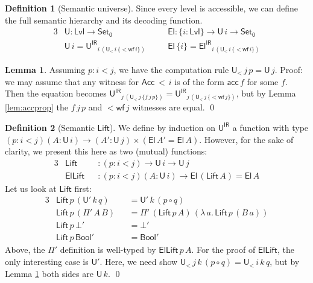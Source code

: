 \documentclass[a4paper,UKenglish,cleveref, autoref, thm-restate]{lipics-v2021}
\theoremstyle{remark}
\theoremstyle{definition}
\newtheorem{mydefinition}{Definition}
\newtheorem{mylemma}{Lemma}
\newcommand{\Set}[1]{\mathsf{Set_{#1}}}
\newcommand{\U}{\mathsf{U}}
\newcommand{\El}{\mathsf{El}}
\newcommand{\Bool}{\mathsf{Bool}}
\newcommand{\Lift}{\mathsf{Lift}}
\newcommand{\Acc}{\mathsf{Acc}}
\newcommand{\acc}{\mathsf{acc}}
\newcommand{\Lvl}{\mathsf{Lvl}}
\renewcommand{\U}{\mathsf{U}}
\newcommand{\msf}[1]{\mathsf{#1}}
\newcommand{\uir}{\msf{U^{IR}}}
\newcommand{\elir}{\msf{El^{IR}}}
\newcommand{\ult}{\U_{<}}
\begin{document}
\begin{mydefinition}[Semantic universe]
Since every level is accessible, we can define the full semantic hierarchy and
its decoding function.
\begin{alignat*}{3}
  &\U : \Lvl \to \Set0
     && \El : \{i : \Lvl\} \to \U\,i \to \Set0 \\
  &\U\,i = \uir_{i\,(\ult\,i\,\{\mathsf{<\!wf}\,i\})}\hspace{1em}
     && \El\,\{i\} = \elir_{i\,(\ult\,i\,\{\mathsf{<\!wf}\,i\})}
\end{alignat*}
\end{mydefinition}

\begin{mylemma}\label{lem:ucomp}
Assuming $p : i < j$, we have the computation rule $\ult\,j\,p = \U\,j$. Proof: we
may assume that any witness for $\Acc\,<\,i$ is of the form $\acc\,f$ for
some $f$. Then the equation becomes $\uir_{j\,(\ult\,j\,\{f\,j\,p\})} =
\uir_{j\,(\ult\,j\,\{\mathsf{<\!wf}\,j\})}$, but by Lemma \ref{lem:accprop}
the $f\,j\,p$ and $\mathsf{<\!wf}\,j$ witnesses are equal. \qed
\end{mylemma}

\begin{mydefinition}[Semantic $\Lift$]
We define by induction on $\uir$ a function with type $(p : i < j)(A : \U\,i)
\to (A' : \U\,j)\times(\El\,A' = \El\,A)$. However, for the sake of clarity, we
present this here as two (mutual) functions:
\begin{alignat*}{3}
  &\Lift\,      &&: (p : i < j) \to \U\,i \to \U\,j\\
  &\msf{ElLift} &&: (p : i < j)(A : \U\,i) \to \El\,(\Lift\,A) = \El\,A
\end{alignat*}
Let us look at $\Lift$ first:
\begin{alignat*}{3}
  &\Lift\,p\,(\U'\,k\,q)    &&= \U'\,k\,(p \circ q)\\
  &\Lift\,p\,(\Pi'\,A\,B)   &&= \Pi'\,(\Lift\,p\,A)\,(\lambda\,a.\,\Lift\,p\,(B\,a))\\
  &\Lift\,p\,\bot'          &&= \bot'\\
  &\Lift\,p\,\Bool'         &&= \Bool'
\end{alignat*}
Above, the $\Pi'$ definition is well-typed by $\msf{ElLift}\,p\,A$. For the
proof of $\msf{ElLift}$, the only interesting case is $\U'$. Here, we need
show $\ult\,j\,k\,(p \circ q) = \ult\,i\,k\,q$, but by Lemma
\ref{lem:ucomp} both sides are $\U\,k$. \qed
\end{mydefinition}
\end{document}
